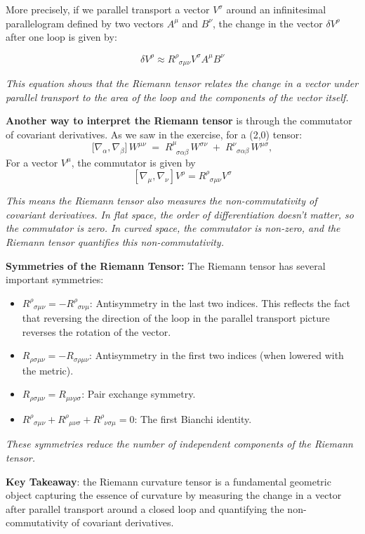 More precisely, if we parallel transport a vector \(V^\sigma\) around an infinitesimal parallelogram defined by two vectors \(A^\mu\) and \(B^\nu\), the change in the vector \(\delta V^\rho\) after one loop is given by:

\[
\delta V^\rho \approx R^\rho_{\;\;\sigma\mu\nu} V^\sigma A^\mu B^\nu
\]

\textit{This equation shows that the Riemann tensor relates the change in a vector under parallel transport to the area of the loop and the components of the vector itself.}

\textbf{Another way to interpret the Riemann tensor} is through the commutator of covariant derivatives. As we saw in the exercise, for a (2,0) tensor:
\[
\bigl[\nabla_{\alpha}, \nabla_{\beta}\bigr]\,W^{\mu\nu}
\;=\;
R^\mu_{\;\;\sigma\alpha\beta}\,W^{\sigma\nu}
\;+\;
R^\nu_{\;\;\sigma\alpha\beta}\,W^{\mu\sigma},
\]
For a vector \(V^\mu\), the commutator is given by
\[
[\nabla_\mu, \nabla_\nu] V^\rho = R^\rho_{\;\;\sigma\mu\nu} V^\sigma
\]

\textit{This means the Riemann tensor also measures the non-commutativity of covariant derivatives. In flat space, the order of differentiation doesn't matter, so the commutator is zero. In curved space, the commutator is non-zero, and the Riemann tensor quantifies this non-commutativity.}

\textbf{Symmetries of the Riemann Tensor:} The Riemann tensor has several important symmetries:
\begin{itemize}
    \item \(R^\rho_{\;\;\sigma\mu\nu} = -R^\rho_{\;\;\sigma\nu\mu}\): Antisymmetry in the last two indices. This reflects the fact that reversing the direction of the loop in the parallel transport picture reverses the rotation of the vector.
    \item \(R_{\rho\sigma\mu\nu} = -R_{\sigma\rho\mu\nu}\): Antisymmetry in the first two indices (when lowered with the metric).
    \item \(R_{\rho\sigma\mu\nu} = R_{\mu\nu\rho\sigma}\): Pair exchange symmetry.
    \item \(R^\rho_{\;\;\sigma\mu\nu} + R^\rho_{\;\;\mu\nu\sigma} + R^\rho_{\;\;\nu\sigma\mu} = 0\): The first Bianchi identity.
\end{itemize}

\textit{These symmetries reduce the number of independent components of the Riemann tensor.}

\textbf{Key Takeaway}: the Riemann curvature tensor is a fundamental geometric object capturing the essence of curvature by measuring the change in a vector after parallel transport around a closed loop and quantifying the non-commutativity of covariant derivatives.

